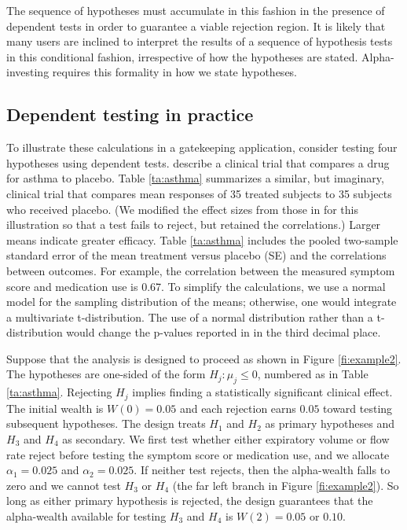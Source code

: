 \documentclass[12pt]{article}
\begin{document}
 The sequence of hypotheses must accumulate in this fashion in the presence of
 dependent tests in order to guarantee a viable rejection region.  It is likely
 that many users are inclined to interpret the results of a sequence of
 hypothesis tests in this conditional fashion, irrespective of how the
 hypotheses are stated.  Alpha-investing requires this formality in how we state
 hypotheses.
 

 \subsection{ Dependent testing in practice }

 To illustrate these calculations in a gatekeeping application, consider testing
 four hypotheses using dependent tests.  \citet{zhang97me} describe a clinical
 trial that compares a drug for asthma to placebo.  Table \ref{ta:asthma}
 summarizes a similar, but imaginary, clinical trial that compares mean
 responses of 35 treated subjects to 35 subjects who received placebo.  (We
 modified the effect sizes from those in \citet{zhang97me} for this illustration
 so that a test fails to reject, but retained the correlations.)  Larger means
 indicate greater efficacy.  Table \ref{ta:asthma} includes the pooled
 two-sample standard error of the mean treatment versus placebo (SE) and the
 correlations between outcomes.  For example, the correlation between the
 measured symptom score and medication use is 0.67.  To simplify the
 calculations, we use a normal model for the sampling distribution of the means;
 otherwise, one would integrate a multivariate t-distribution.  The use of a
 normal distribution rather than a t-distribution would change the p-values
 reported in \citet{zhang97me} in the third decimal place.


 Suppose that the analysis is designed to proceed as shown in Figure
 \ref{fi:example2}.  The hypotheses are one-sided of the form $H_j: \mu_j \le
 0$, numbered as in Table \ref{ta:asthma}.  Rejecting $H_j$ implies finding a
 statistically significant clinical effect.  The initial wealth is $W(0) = 0.05$
 and each rejection earns $0.05$ toward testing subsequent hypotheses.  The
 design treats $H_1$ and $H_2$ as primary hypotheses and $H_3$ and $H_4$ as
 secondary.  We first test whether either expiratory volume or flow rate reject
 before testing the symptom score or medication use, and we allocate $\alpha_1 =
 0.025$ and $\alpha_2 = 0.025$.  If neither test rejects, then the alpha-wealth
 falls to zero and we cannot test $H_3$ or $H_4$ (the far left branch in Figure
 \ref{fi:example2}).  So long as either primary hypothesis is rejected, the
 design guarantees that the alpha-wealth available for testing $H_3$ and $H_4$
 is $W(2) = 0.05$ or $0.10$.
\end{document}
